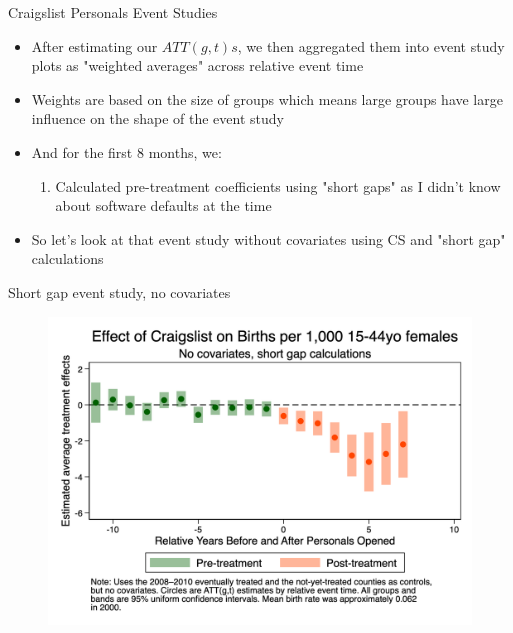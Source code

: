 \documentclass{beamer}
\begin{document}
\begin{frame}{Craigslist Personals Event Studies}

\begin{itemize}
\item After estimating our $ATT(g,t)s$, we then aggregated them into event study plots as "weighted averages" across relative event time 
\item Weights are based on the size of groups which means large groups have large influence on the shape of the event study
\item And for the first 8 months, we:
	\begin{enumerate}
	\item Calculated pre-treatment coefficients using "short gaps" as I didn't know about software defaults at the time
	\end{enumerate}
\item So let's look at that event study without covariates using CS and "short gap" calculations 
\end{itemize}

\end{frame}


\begin{frame}{Short gap event study, no covariates}

\begin{figure}
    \centering
    \includegraphics[height=0.85\textheight]{./lecture_includes/es_births_shortnone.png}
\end{figure}

\end{frame}
\end{document}
